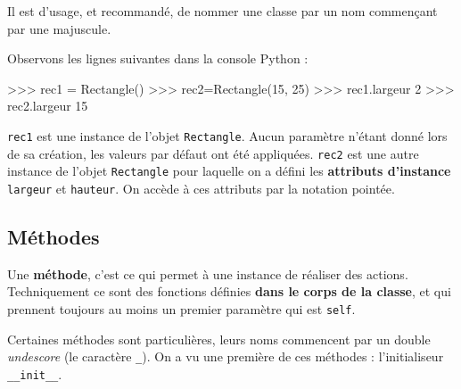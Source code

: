 \documentclass[
  french,
  letterpaper,
  DIV=11,
  numbers=noendperiod]{scrartcl}
\newenvironment{Shaded}{\begin{snugshade}}{\end{snugshade}}
\newcommand{\DecValTok}[1]{\textcolor[rgb]{0.68,0.00,0.00}{#1}}
\newcommand{\NormalTok}[1]{\textcolor[rgb]{0.00,0.23,0.31}{#1}}
\newcommand{\OperatorTok}[1]{\textcolor[rgb]{0.37,0.37,0.37}{#1}}
\begin{document}
\begin{tcolorbox}[enhanced jigsaw, breakable, title=\textcolor{quarto-callout-tip-color}{\faLightbulb}\hspace{0.5em}{Remarque}, toptitle=1mm, coltitle=black, colback=white, left=2mm, colbacktitle=quarto-callout-tip-color!10!white, opacityback=0, opacitybacktitle=0.6, bottomtitle=1mm, colframe=quarto-callout-tip-color-frame, bottomrule=.15mm, rightrule=.15mm, arc=.35mm, titlerule=0mm, toprule=.15mm, leftrule=.75mm]

Il est d'usage, et recommandé, de nommer une classe par un nom
commençant par une majuscule.

\end{tcolorbox}

Observons les lignes suivantes dans la console Python :

\begin{Shaded}
\begin{Highlighting}[]
\OperatorTok{\textgreater{}\textgreater{}\textgreater{}}\NormalTok{ rec1 }\OperatorTok{=}\NormalTok{ Rectangle()}
\OperatorTok{\textgreater{}\textgreater{}\textgreater{}}\NormalTok{ rec2}\OperatorTok{=}\NormalTok{Rectangle(}\DecValTok{15}\NormalTok{, }\DecValTok{25}\NormalTok{)}
\OperatorTok{\textgreater{}\textgreater{}\textgreater{}}\NormalTok{ rec1.largeur}
\DecValTok{2}
\OperatorTok{\textgreater{}\textgreater{}\textgreater{}}\NormalTok{ rec2.largeur}
\DecValTok{15}
\end{Highlighting}
\end{Shaded}

\texttt{rec1} est une instance de l'objet \texttt{Rectangle}. Aucun
paramètre n'étant donné lors de sa création, les valeurs par défaut ont
été appliquées. \texttt{rec2} est une autre instance de l'objet
\texttt{Rectangle} pour laquelle on a défini les \textbf{attributs
d'instance} \texttt{largeur} et \texttt{hauteur}. On accède à ces
attributs par la notation pointée.

\subsection{Méthodes}\label{muxe9thodes}

Une \textbf{méthode}, c'est ce qui permet à une instance de réaliser des
actions. Techniquement ce sont des fonctions définies \textbf{dans le
corps de la classe}, et qui prennent toujours au moins un premier
paramètre qui est \texttt{self}.

Certaines méthodes sont particulières, leurs noms commencent par un
double \emph{undescore} (le caractère \texttt{\_}). On a vu une première
de ces méthodes : l'initialiseur \texttt{\_\_init\_\_}.
\end{document}
